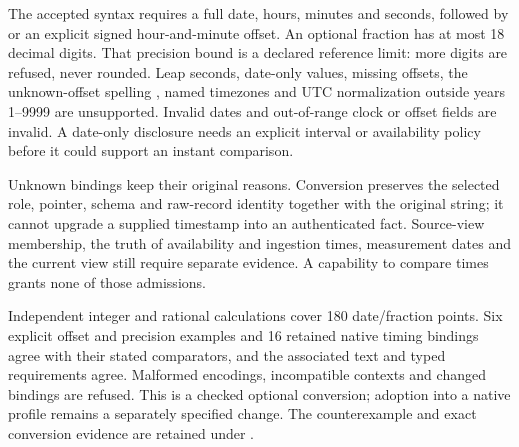 The accepted syntax requires a full date, hours, minutes and seconds, followed
by  or an explicit signed hour-and-minute offset. An optional fraction
has at most 18 decimal digits. That precision bound is a declared reference
limit: more digits are refused, never rounded. Leap seconds, date-only values,
missing offsets, the unknown-offset spelling , named timezones and
UTC normalization outside years 1--9999 are unsupported. Invalid dates and
out-of-range clock or offset fields are invalid. A date-only disclosure needs
an explicit interval or availability policy before it could support an instant
comparison.

Unknown bindings keep their original reasons. Conversion preserves the selected
role, pointer, schema and raw-record identity together with the original string;
it cannot upgrade a supplied timestamp into an authenticated fact. Source-view
membership, the truth of availability and ingestion times, measurement dates
and the current view still require separate evidence. A capability to compare
times grants none of those admissions.

Independent integer and rational calculations cover 180 date/fraction points.
Six explicit offset and precision examples and 16 retained native timing
bindings agree with their stated comparators, and the associated text and typed
requirements agree. Malformed encodings, incompatible contexts and changed
bindings are refused. This is a checked optional conversion; adoption into a
native profile remains a separately specified change. The counterexample and
exact conversion evidence are retained under
.
